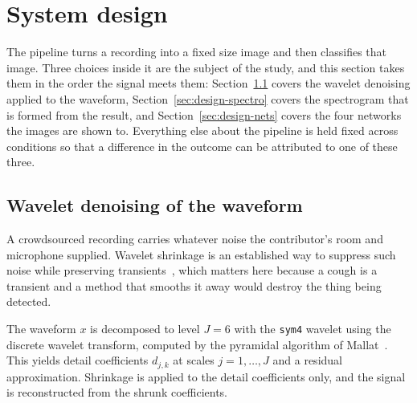 \section{System design}\label{sec:design}

The pipeline turns a recording into a fixed size image and then classifies that image.
Three choices inside it are the subject of the study, and this section takes them in the
order the signal meets them: Section~\ref{sec:design-denoise} covers the wavelet
denoising applied to the waveform, Section~\ref{sec:design-spectro} covers the
spectrogram that is formed from the result, and Section~\ref{sec:design-nets} covers the
four networks the images are shown to. Everything else about the pipeline is held fixed
across conditions so that a difference in the outcome can be attributed to one of these
three.

\subsection{Wavelet denoising of the waveform}\label{sec:design-denoise}

A crowdsourced recording carries whatever noise the contributor's room and microphone
supplied. Wavelet shrinkage is an established way to suppress such noise while preserving
transients~\cite{donoho1994}, which matters here because a cough is a transient and a
method that smooths it away would destroy the thing being detected.

The waveform $x$ is decomposed to level $J = 6$ with the \texttt{sym4} wavelet using the
discrete wavelet transform, computed by the pyramidal algorithm of
Mallat~\cite{mallat1989}. This yields detail coefficients $d_{j,k}$ at scales
$j = 1, \dots, J$ and a residual approximation. Shrinkage is applied to the detail
coefficients only, and the signal is reconstructed from the shrunk coefficients.

